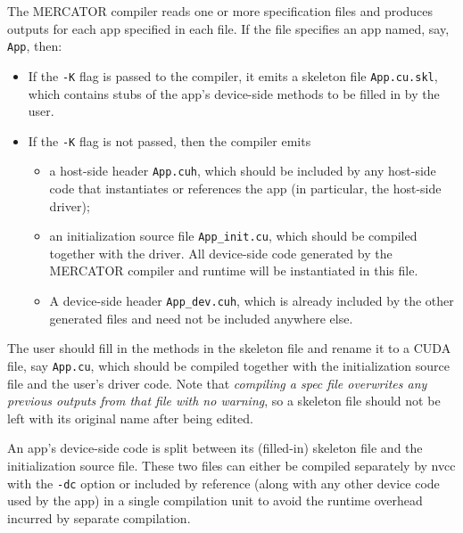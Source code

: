 \documentclass[11pt]{article}
\begin{document}
The MERCATOR compiler reads one or more specification files and
produces outputs for each app specified in each file.  If the file
specifies an app named, say, \texttt{App}, then:
\begin{itemize}

\item If the \texttt{-K} flag is passed to the compiler, it emits a
  skeleton file \texttt{App.cu.skl}, which contains stubs of the app's
  device-side methods to be filled in by the user.

\item If the \texttt{-K} flag is not passed, then the compiler emits

\begin{itemize}

\item a host-side header \texttt{App.cuh}, which should be included
  by any host-side code that instantiates or references the app
  (in particular, the host-side driver);

\item an initialization source file \texttt{App_init.cu}, which should
  be compiled together with the driver.  All device-side code
  generated by the MERCATOR compiler and runtime will be instantiated
  in this file.

\item A device-side header \texttt{App_dev.cuh}, which is already
  included by the other generated files and need not be included
  anywhere else.

\end{itemize}

\end{itemize}

The user should fill in the methods in the skeleton file and rename it
to a CUDA file, say \texttt{App.cu}, which should be compiled together
with the initialization source file and the user's driver code.  Note
that \emph{compiling a spec file overwrites any previous outputs from
  that file with no warning}, so a skeleton file should not be left
with its original name after being edited.

An app's device-side code is split between its (filled-in) skeleton
file and the initialization source file.  These two files can either
be compiled separately by nvcc with the \texttt{-dc} option or
included by reference (along with any other device code used by the
app) in a single compilation unit to avoid the runtime overhead
incurred by separate compilation.
\end{document}
